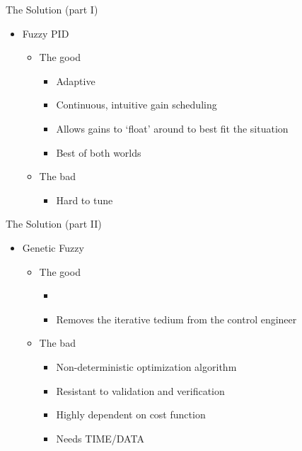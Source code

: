 \documentclass[]{beamer}
\begin{document}
\begin{frame}{The Solution (part I)}
\begin{itemize}
\item Fuzzy PID
    \begin{itemize}
    \item The good
        \begin{itemize}
        \item Adaptive
        \item Continuous, intuitive gain scheduling
        \item Allows gains to `float' around to best fit the situation
        \item Best of both worlds
        \end{itemize}
    \item The bad
        \begin{itemize}
        \item Hard to tune
        \end{itemize}
    \end{itemize}
\end{itemize}
\end{frame}


\begin{frame}{The Solution (part II)}
\begin{itemize}
\item Genetic Fuzzy
    \begin{itemize}
    \item The good
        \begin{itemize}
        \item{}
        \item<3-> Removes the iterative tedium from the control engineer
        \end{itemize}
    \item<4-> The bad
        \begin{itemize}
        \item<5-> Non-deterministic optimization algorithm
        \item<6-> Resistant to validation and verification
        \item<7-> Highly dependent on cost function
        \item<8-> Needs TIME/DATA
        \end{itemize}
    \end{itemize}
\end{itemize}
\end{frame}
\end{document}
